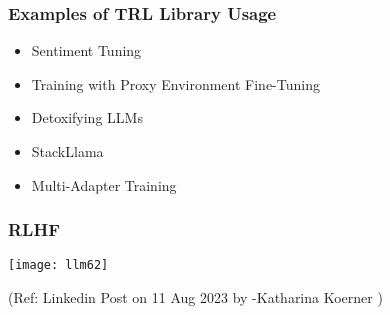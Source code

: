 \begin{frame}[fragile]\frametitle{Examples of TRL Library Usage}
\begin{itemize}
    \item Sentiment Tuning
    \item Training with Proxy Environment Fine-Tuning
    \item Detoxifying LLMs
    \item StackLlama
    \item Multi-Adapter Training
\end{itemize}
\end{frame}

\begin{frame}[fragile]\frametitle{RLHF}

\begin{center}
\texttt{[image: llm62]}
\end{center}		


{\tiny (Ref: Linkedin Post on 11 Aug 2023 by -Katharina Koerner )}

\end{frame}
